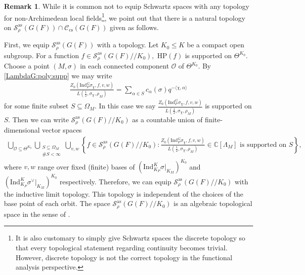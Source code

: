 \documentclass[10pt]{amsart}
\theoremstyle{definition}
\newtheorem{remark}[theorem]{Remark}
\numberwithin{equation}{section}
\numberwithin{equation}{subsection}
\newcommand{\Ind}{\mathrm{Ind}}
\newcommand{\CC}{\mathbb{C}}
\newcommand{\GG}{\mathbb{G}}
\begin{document}
\begin{remark}\label{remark:topology}
    While it is common not to equip Schwartz spaces with any topology for non-Archimedean local fields\footnote{It is also customary to simply give Schwartz spaces the discrete topology so that every topological statement regarding continuity becomes trivial. However, discrete topology is not the correct topology in the functional analysis perspective.}, we point out that there is a natural topology on $\mathcal{S}_{\rho}^{\mathrm{as}}(G(F))\cap  \mathcal{C}_{\mathrm{cs}}(G(F))$  given as follows.
    
    First, we equip $\mathcal{S}_\rho^{\mathrm{as}}(G(F))$ with a topology. Let $K_0\le K$ be a compact open subgroup. For a function $f\in \mathcal{S}_\rho^{\mathrm{as}}(G(F)/\!/K_0),$ $\mathrm{HP}(f)$ is supported on $\Theta^{K_0}.$  Choose a point $(M,\sigma)$ in each connected component $\mathcal{O}$ of $\Theta^{K_0}.$ By \eqref{LambdaG:poly:supp} we may write
    \begin{align*}
        \frac{Z_0(\Ind^G_P \sigma_\chi, f,v,w)}{L(\frac{1}{2},\sigma_\chi,\rho_M)} = \sum_{\alpha\in S} c_\alpha(\sigma) q^{-\langle\chi,\alpha\rangle} 
    \end{align*}
    for some finite subset $S\subseteq \Omega_{M}$. In this case we say $\frac{Z_0(\Ind^G_P \sigma_\chi, f,v,w)}{L(\frac{1}{2},\sigma_\chi,\rho_M)}$ is supported on $S$. Then
    we can write $\mathcal{S}_\rho^{\mathrm{as}}(G(F)/\!/K_0)$ as a countable union of finite-dimensional vector spaces
    \begin{align*}
        \bigcup_{\mathcal{O}\subseteq \Theta^{K_0}}\bigcup_{\substack{S\subseteq \Omega_{M}\\\#S<\infty}} \bigcup_{v,w}\left\{ f\in \mathcal{S}_\rho^{\mathrm{as}}(G(F)/\!/K_0):  \frac{Z_0(\Ind^G_P \sigma_\chi, f,v,w)}{L(\frac{1}{2},\sigma_\chi,\rho_M)}\in \CC[\Lambda_M] \textrm{ is supported on $S$}\right\},
    \end{align*}
    where $v,w$ range over fixed (finite) bases of $\left(\mathrm{Ind}_{K_P}^K \sigma|_{K_M}\right)^{K_0}$ and $\left(\mathrm{Ind}_{K_P}^K \sigma^\lor|_{K_M}\right)^{K_0}$ respectively.
Therefore, we can equip $\mathcal{S}_\rho^{\mathrm{as}}(G(F)/\!/K_0)$ with the inductive limit topology. This topology is independent of the choices of the base point of each orbit. The space $\mathcal{S}_\rho^{\mathrm{as}}(G(F)/\!/K_0)$ is an algebraic topological space in the sense of \cite[Definition 4.1.1]{Li:zeta}. 





\end{remark}
\end{document}
